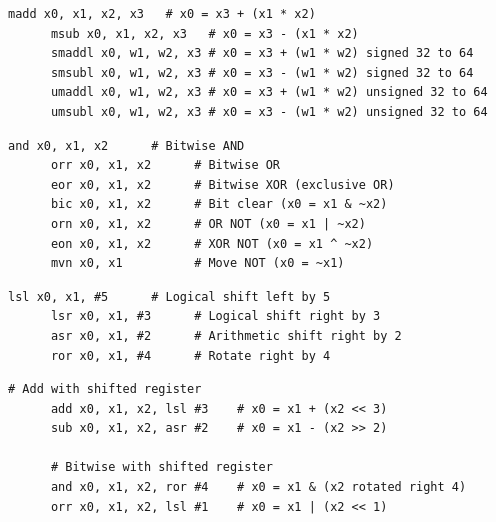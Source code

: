   \begin{definition}
    \label{def:multiply-accumulate}
    \begin{lstlisting}[language=arm]
      madd x0, x1, x2, x3   # x0 = x3 + (x1 * x2)
      msub x0, x1, x2, x3   # x0 = x3 - (x1 * x2)
      smaddl x0, w1, w2, x3 # x0 = x3 + (w1 * w2) signed 32 to 64
      smsubl x0, w1, w2, x3 # x0 = x3 - (w1 * w2) signed 32 to 64
      umaddl x0, w1, w2, x3 # x0 = x3 + (w1 * w2) unsigned 32 to 64
      umsubl x0, w1, w2, x3 # x0 = x3 - (w1 * w2) unsigned 32 to 64
    \end{lstlisting}
  \end{definition}

  \begin{definition}
    \label{def:bitwise-operations}
    \begin{lstlisting}[language=arm]
      and x0, x1, x2      # Bitwise AND
      orr x0, x1, x2      # Bitwise OR
      eor x0, x1, x2      # Bitwise XOR (exclusive OR)
      bic x0, x1, x2      # Bit clear (x0 = x1 & ~x2)
      orn x0, x1, x2      # OR NOT (x0 = x1 | ~x2)
      eon x0, x1, x2      # XOR NOT (x0 = x1 ^ ~x2)
      mvn x0, x1          # Move NOT (x0 = ~x1)
    \end{lstlisting}
  \end{definition}

  \begin{definition}
    \label{def:shift-operations}
    \begin{lstlisting}[language=arm]
      lsl x0, x1, #5      # Logical shift left by 5
      lsr x0, x1, #3      # Logical shift right by 3
      asr x0, x1, #2      # Arithmetic shift right by 2
      ror x0, x1, #4      # Rotate right by 4
    \end{lstlisting}
  \end{definition}

  \begin{definition}
    \label{def:combined-operations}
    \begin{lstlisting}[language=arm]
      # Add with shifted register
      add x0, x1, x2, lsl #3    # x0 = x1 + (x2 << 3)
      sub x0, x1, x2, asr #2    # x0 = x1 - (x2 >> 2)
      
      # Bitwise with shifted register  
      and x0, x1, x2, ror #4    # x0 = x1 & (x2 rotated right 4)
      orr x0, x1, x2, lsl #1    # x0 = x1 | (x2 << 1)
    \end{lstlisting}
  \end{definition}

